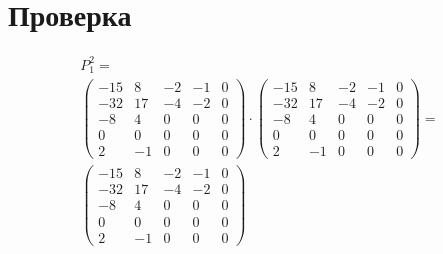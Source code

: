 \documentclass[12pt, a4paper]{article}
\begin{document}
    \section{Проверка}
    
    \begin{multline}
        P_1^2 = \\
        \left(\begin{matrix}
            -15 & 8 & -2 & -1 & 0 \\
            -32 & 17 & -4 & -2 & 0 \\
            -8 & 4 & 0 & 0 & 0 \\
            0 & 0 & 0 & 0 & 0 \\
            2 & -1 & 0 & 0 & 0
        \end{matrix}\right) \cdot \left(\begin{matrix}
            -15 & 8 & -2 & -1 & 0 \\
            -32 & 17 & -4 & -2 & 0 \\
            -8 & 4 & 0 & 0 & 0 \\
            0 & 0 & 0 & 0 & 0 \\
            2 & -1 & 0 & 0 & 0
        \end{matrix}\right) = \\ \left(\begin{matrix}
            -15 & 8 & -2 & -1 & 0 \\
            -32 & 17 & -4 & -2 & 0 \\
            -8 & 4 & 0 & 0 & 0 \\
            0 & 0 & 0 & 0 & 0 \\
            2 & -1 & 0 & 0 & 0
        \end{matrix}\right)
    \end{multline}
\end{document}
